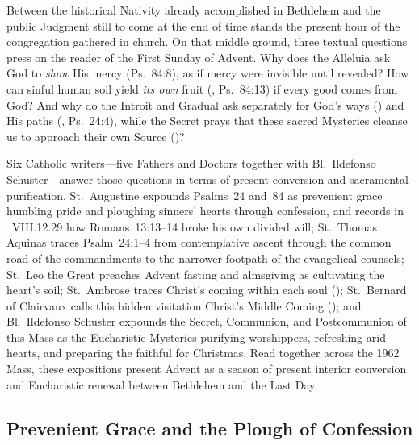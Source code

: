 
Between the historical Nativity already accomplished in Bethlehem and the public Judgment still to come at the end of time stands the present hour of the congregation gathered in church. On that middle ground, three textual questions press on the reader of the First Sunday of Advent. Why does the Alleluia ask God to \emph{show} His mercy (Ps.~84:8), as if mercy were invisible until revealed? How can sinful human soil yield \emph{its own} fruit (, Ps.~84:13) if every good comes from God? And why do the Introit and Gradual ask separately for God's ways () and His paths (, Ps.~24:4), while the Secret prays that these sacred Mysteries cleanse us to approach their own Source ()?

Six Catholic writers---five Fathers and Doctors together with Bl.~Ildefonso Schuster---answer those questions in terms of present conversion and sacramental purification. St.~Augustine expounds Psalms~24 and~84 as prevenient grace humbling pride and ploughing sinners' hearts through confession, and records in ~VIII.12.29 how Romans~13:13--14 broke his own divided will; St.~Thomas Aquinas traces Psalm~24:1--4 from contemplative ascent through the common road of the commandments to the narrower footpath of the evangelical counsels; St.~Leo the Great preaches Advent fasting and almsgiving as cultivating the heart's soil; St.~Ambrose traces Christ's coming within each soul (); St.~Bernard of Clairvaux calls this hidden visitation Christ's Middle Coming (); and Bl.~Ildefonso Schuster expounds the Secret, Communion, and Postcommunion of this Mass as the Eucharistic Mysteries purifying worshippers, refreshing arid hearts, and preparing the faithful for Christmas. Read together across the 1962 Mass, these expositions present Advent as a season of present interior conversion and Eucharistic renewal between Bethlehem and the Last Day.

\subsection{Prevenient Grace and the Plough of Confession}

